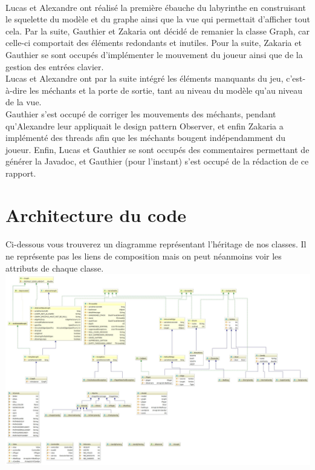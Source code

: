 \documentclass{article}
\begin{document}
  \paragraph{}
  Lucas et Alexandre ont réalisé la première ébauche du labyrinthe en
  construisant le squelette du modèle et du graphe ainsi que la vue qui
  permettait d'afficher tout cela. Par la suite, Gauthier et Zakaria ont décidé
  de remanier la classe Graph, car celle-ci comportait des éléments redondants
  et inutiles. Pour la suite, Zakaria et Gauthier se sont occupés d'implémenter
  le mouvement du joueur ainsi que de la gestion des entrées clavier.\\
  Lucas et Alexandre ont par la suite intégré les éléments manquants du jeu,
  c'est-à-dire les méchants et la porte de sortie, tant au niveau du
  modèle qu'au niveau de la vue.\\
  Gauthier s'est occupé de corriger les mouvements des méchants, pendant
  qu'Alexandre leur appliquait le design pattern Observer, et enfin Zakaria a
  implémenté des threads afin que les méchants bougent indépendamment du joueur.
  Enfin, Lucas et Gauthier se sont occupés des commentaires permettant de
  générer la Javadoc, et Gauthier (pour l'instant) s'est occupé de la rédaction
  de ce rapport.

  \section{Architecture du code}
  \paragraph{}
  Ci-dessous vous trouverez un diagramme représentant l'héritage de nos classes.
  Il ne représente pas les liens de composition mais on peut néanmoins voir les
  attributs de chaque classe.\\

  \includegraphics[width=17cm]{Controller2.jpg}
\end{document}
